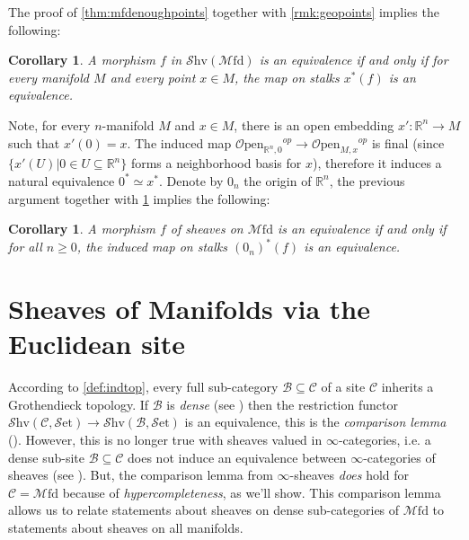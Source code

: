 \documentclass[10pt]{amsart}
\newcommand{\B}{\mathscr{B}}
\newcommand{\C}{\mathscr{C}}
\newcommand{\bR}{\mathbb{R}}
\newcommand{\set}{\mathscr{S}\mathrm{et}}
\newcommand{\Mfd}{\mathscr{M}\mathrm{fd}}
\newcommand{\Shv}{\mathscr{S}\mathrm{hv}}
\newcommand{\Open}{\mathscr{O}\mathrm{pen}}
\newtheorem{corollary}[equation]{Corollary}
\theoremstyle{definition}
\theoremstyle{remark}
\numberwithin{equation}{section}
\begin{document}
The proof of \cref{thm:mfdenoughpoints} together with \cref{rmk:geopoints} implies the following: 
\begin{corollary}\label{cor:points}
  A morphism $f$ in $\Shv(\Mfd)$ is an equivalence if and only if for every manifold $M$ and every point $x \in M$, the map on stalks $x^*(f)$ is an equivalence.
\end{corollary}
Note, for every $n$-manifold $M$ and $x\in M$, there is an open embedding $x':\bR^n\to M$ such that $x'(0)=x$. The induced map $\Open_{\bR^n,0}{}^{op}\to\Open_{M,x}{}^{op}$ is final (since $\{x'(U)|0\in U\subseteq\bR^n\}$ forms a neighborhood basis for $x$), therefore it induces a natural equivalence $0^*\simeq x^*$. Denote by $0_n$ the origin of $\bR^n$, the previous argument together with \cref{cor:points} implies the following:
\begin{corollary}
  A morphism $f$ of sheaves on $\Mfd$ is an equivalence if and only if for all $n \geq 0$, the induced map on stalks $(0_n)^*(f) $ is an equivalence.
\end{corollary}

\section{Sheaves of Manifolds via the Euclidean site}

According to \cref{def:indtop}, every full sub-category $\B\subseteq\C$ of a site $\C$ inherits a Grothendieck topology. If $\B$ is \emph{dense} (see \cite[Definition 2.2.1]{johnstone2002elephanti}) then the restriction functor $\Shv(\C,\set)\to\Shv(\B,\set)$ is an equivalence, this is the \emph{comparison lemma} (\cite[Theorem 2.2.3]{johnstone2002elephanti}). However, this is no longer true with sheaves valued in $\infty$-categories, i.e. a dense sub-site $\B\subseteq\C$ does not induce an equivalence between $\infty$-categories of sheaves (see \cite[Counterexample 20.4.0.1]{lurie2018sag}). But, the comparison lemma from $\infty$-sheaves \emph{does} hold for $\C=\Mfd$ because of \emph{hypercompleteness}, as we'll show. This comparison lemma allows us to relate statements about sheaves on dense sub-categories of $\Mfd$ to statements about sheaves on all manifolds.
\end{document}
